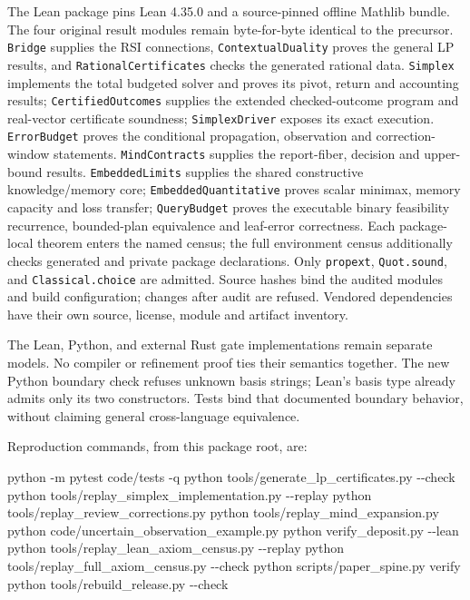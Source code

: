\documentclass[
  10pt,
]{article}
\newenvironment{Shaded}{}{}
\newcommand{\NormalTok}[1]{#1}
\begin{document}
The Lean package pins Lean 4.35.0 and a source-pinned offline Mathlib bundle. The four original result modules remain byte-for-byte identical to the precursor. \texttt{Bridge} supplies the RSI connections, \texttt{ContextualDuality} proves the general LP results, and \texttt{RationalCertificates} checks the generated rational data. \texttt{Simplex} implements the total budgeted solver and proves its pivot, return and accounting results; \texttt{CertifiedOutcomes} supplies the extended checked-outcome program and real-vector certificate soundness; \texttt{SimplexDriver} exposes its exact execution. \texttt{ErrorBudget} proves the conditional propagation, observation and correction-window statements. \texttt{MindContracts} supplies the report-fiber, decision and upper-bound results. \texttt{EmbeddedLimits} supplies the shared constructive knowledge/memory core; \texttt{EmbeddedQuantitative} proves scalar minimax, memory capacity and loss transfer; \texttt{QueryBudget} proves the executable binary feasibility recurrence, bounded-plan equivalence and leaf-error correctness. Each package-local theorem enters the named census; the full environment census additionally checks generated and private package declarations. Only \texttt{propext}, \texttt{Quot.sound}, and \texttt{Classical.choice} are admitted. Source hashes bind the audited modules and build configuration; changes after audit are refused. Vendored dependencies have their own source, license, module and artifact inventory.

The Lean, Python, and external Rust gate implementations remain separate models. No compiler or refinement proof ties their semantics together. The new Python boundary check refuses unknown basis strings; Lean's basis type already admits only its two constructors. Tests bind that documented boundary behavior, without claiming general cross-language equivalence.

Reproduction commands, from this package root, are:

\begin{Shaded}
\begin{Highlighting}[]
\NormalTok{python {-}m pytest code/tests {-}q}
\NormalTok{python tools/generate\_lp\_certificates.py {-}{-}check}
\NormalTok{python tools/replay\_simplex\_implementation.py {-}{-}replay}
\NormalTok{python tools/replay\_review\_corrections.py}
\NormalTok{python tools/replay\_mind\_expansion.py}
\NormalTok{python code/uncertain\_observation\_example.py}
\NormalTok{python verify\_deposit.py {-}{-}lean}
\NormalTok{python tools/replay\_lean\_axiom\_census.py {-}{-}replay}
\NormalTok{python tools/replay\_full\_axiom\_census.py {-}{-}check}
\NormalTok{python scripts/paper\_spine.py verify}
\NormalTok{python tools/rebuild\_release.py {-}{-}check}
\end{Highlighting}
\end{Shaded}
\end{document}
